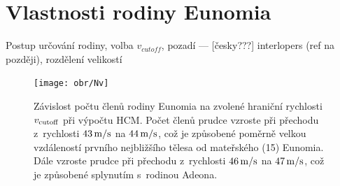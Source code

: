 \documentclass[A4paper, 12pt, oneside]{book}%
\begin{document}
\chapter{Vlastnosti rodiny Eunomia} \label{ch:eunomia}
Postup určování rodiny, volba $v_{cutoff}$, pozadí --- [česky???] interlopers (ref na později), rozdělení velikostí 
\begin{figure}[!htb]
	\centering
	\texttt{[image: obr/Nv]}
	\caption{Závislost počtu členů rodiny Eunomia na zvolené hraniční rychlosti $v_{\rm cutoff}$ při výpočtu HCM. Počet členů prudce vzroste při přechodu z~rychlosti $43\,{\rm m/s}$ na $44\,{\rm m/s}$, což je způsobené poměrně velkou vzdáleností prvního nejbližšího tělesa od mateřského (15) Eunomia. Dále vzroste prudce při přechodu z~rychlosti $46\,{\rm m/s}$ na $47\,{\rm m/s}$, což je způsobené splynutím s~rodinou Adeona.}
	\label{Nv}
\end{figure}
\end{document}
